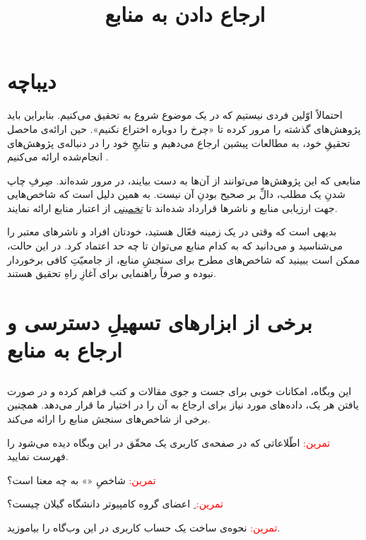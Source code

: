 \documentclass{article}
\begin{document}
\baselineskip=0.8cm
\title{ارجاع دادن به منابع}
\maketitle
\section{دیباچه}
احتمالاً اوّلین فردی نیستیم که در یک موضوع شروع به تحقیق می‌کنیم. بنابراین باید پژوهش‌های گذشته را مرور کرده تا «چرخ را دوباره اختراع نکنیم». حین ارائه‌ی ماحصل تحقیقِ خود، به مطالعات پیشین ارجاع می‌دهیم و نتایجِ خود را در دنباله‌ی پژوهش‌های انجام‌شده ارائه می‌کنیم \cite{shahbahrami, rankoohi}. 

منابعی که این پژوهش‌ها می‌توانند از آن‌ها به دست بیایند، در \cite{shahbahrami, rankoohi} مرور شده‌اند. صِرفِ چاپ شدنِ یک مطلب، دالِّ بر صحیح بودنِ آن نیست. به همین دلیل است که شاخص‌هایی جهت ارزیابی منابع و ناشرها قرارداد شده‌اند تا \emph{\underline{تخمینی}} از اعتبار منابع ارائه نمایند. 

بدیهی است که وقتی در یک زمینه فعّال هستید، خودتان افراد و ناشرهای معتبر را می‌شناسید و می‌دانید که به کدام منابع می‌توان تا چه حد اعتماد کرد. در این حالت، ممکن است ببینید که شاخص‌های مطرح برای سنجشِ منابع، از جامعیّتِ کافی برخوردار نبوده و صرفاً راهنمایی برای آغازِ راهِ تحقیق هستند.
\section{برخی از ابزارهای تسهیلِ دسترسی و ارجاع به منابع}
\subsection{\href{https://scholar.google.com}{}}
این وبگاه، امکانات خوبی برای جست و جوی مقالات و کتب فراهم کرده و در صورت یافتن هر یک، داده‌های مورد نیاز برای ارجاع به آن را در اختیار ما قرار می‌دهد. همچنین برخی از شاخص‌های سنجش منابع را ارائه می‌کند.

\noindent \textcolor{red}{تمرین:} اطّلاعاتی که در صفحه‌ی کاربری یک محقّق در این وبگاه دیده می‌شود را فهرست نمایید.

\noindent \textcolor{red}{تمرین:} شاخصِ «» به چه معنا است؟

\noindent \textcolor{red}{تمرین:} ِ اعضای گروه کامپیوتر دانشگاه گیلان چیست؟

\noindent \textcolor{red}{تمرین:} نحوه‌ی ساخت یک حساب کاربری در این وب‌گاه را بیاموزید.
\end{document}
